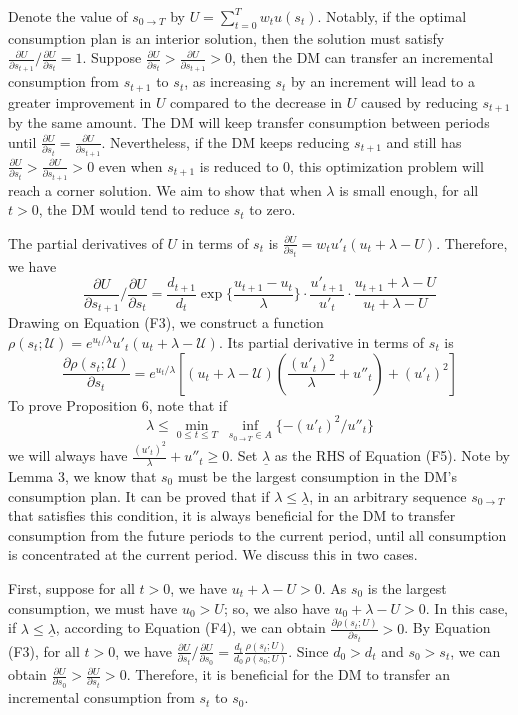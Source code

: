 \documentclass[
  12pt,
]{article}
\begin{document}
Denote the value of \(s_{0\rightarrow T}\) by
\(U=\sum_{t=0}^T w_t u(s_t)\). Notably, if the optimal consumption plan
is an interior solution, then the solution must satisfy
\(\frac{\partial U}{\partial s_{t+1}}/\frac{\partial U}{\partial s_{t}}=1\).
Suppose
\(\frac{\partial U}{\partial s_t}>\frac{\partial U}{\partial s_{t+1}}>0\),
then the DM can transfer an incremental consumption from \(s_{t+1}\) to
\(s_t\), as increasing \(s_t\) by an increment will lead to a greater
improvement in \(U\) compared to the decrease in \(U\) caused by
reducing \(s_{t+1}\) by the same amount. The DM will keep transfer
consumption between periods until
\(\frac{\partial U}{\partial s_t}=\frac{\partial U}{\partial s_{t+1}}\).
Nevertheless, if the DM keeps reducing \(s_{t+1}\) and still has
\(\frac{\partial U}{\partial s_t}>\frac{\partial U}{\partial s_{t+1}}>0\)
even when \(s_{t+1}\) is reduced to 0, this optimization problem will
reach a corner solution. We aim to show that when \(\lambda\) is small
enough, for all \(t>0\), the DM would tend to reduce \(s_t\) to zero.

The partial derivatives of \(U\) in terms of \(s_t\) is
\(\frac{\partial U}{\partial s_t}=w_tu'_t(u_t+\lambda-U)\). Therefore,
we have \[\tag{F3}
\frac{\partial U}{\partial s_{t+1}}/\frac{\partial U}{\partial s_t} = 
\frac{d_{t+1}}{d_t} \exp\{\frac{u_{t+1}-u_t}{\lambda}\}
\cdot\frac{u'_{t+1}}{u'_t}
\cdot\frac{u_{t+1}+\lambda-U}{u_t+\lambda-U}
\]Drawing on Equation (F3), we construct a function
\(\rho(s_t;\mathcal{U})=e^{u_t/\lambda}u'_t(u_t+\lambda-\mathcal{U})\).
Its partial derivative in terms of \(s_t\) is\[\tag{F4}
\frac{\partial \rho(s_t;\mathcal{U})}{\partial s_t} = 
e^{u_t/\lambda}[
(u_t+\lambda-\mathcal{U})(\frac{(u'_t)^2}{\lambda}+u''_t)
+(u'_t)^2]
\]To prove Proposition 6, note that if\[\tag{F5}
\lambda\leq \min_{0 \leq t \leq T} \;\inf_{s_{0\rightarrow T}\in A}\{-(u'_t)^2/u''_t\}
\]we will always have \(\frac{(u'_t)^2}{\lambda}+u''_t \geq 0\). Set
\(\underline{\lambda}\) as the RHS of Equation (F5). Note by Lemma 3, we
know that \(s_0\) must be the largest consumption in the DM's
consumption plan. It can be proved that if
\(\lambda\leq \underline{\lambda}\), in an arbitrary sequence
\(s_{0\rightarrow T}\) that satisfies this condition, it is always
beneficial for the DM to transfer consumption from the future periods to
the current period, until all consumption is concentrated at the current
period. We discuss this in two cases.

First, suppose for all \(t>0\), we have \(u_t+\lambda -U>0\). As \(s_0\)
is the largest consumption, we must have \(u_0>U\); so, we also have
\(u_0+\lambda-U>0\). In this case, if
\(\lambda\leq \underline{\lambda}\), according to Equation (F4), we can
obtain \(\frac{\partial \rho(s_t;U)}{\partial s_t}>0\). By Equation
(F3), for all \(t>0\), we have
\(\frac{\partial U}{\partial s_t}/\frac{\partial U}{\partial s_0}=\frac{d_{t}}{d_0} \frac{\rho(s_t;U)}{\rho(s_0;U)}\).
Since \(d_0>d_t\) and \(s_0>s_t\), we can obtain
\(\frac{\partial U}{\partial s_0}>\frac{\partial U}{\partial s_t}>0\).
Therefore, it is beneficial for the DM to transfer an incremental
consumption from \(s_t\) to \(s_0\).
\end{document}
